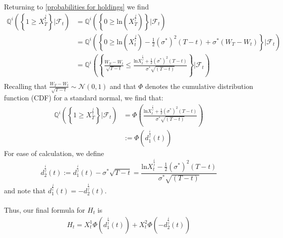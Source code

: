 \documentclass{article}
\theoremstyle{definition}
\begin{document}
Returning to \ref{probabilities for holdings} we find
\begin{align}
    \mathbb{Q}^{i}\left(\left\{1 \geq X_{T}^{\frac{j}{i}}\right\}|\mathcal{F}_{t}\right) &= \mathbb{Q}^{i}\left(\left\{0 \geq \text{ln} (X_{T}^{\frac{j}{i}})\right\}|\mathcal{F}_{t}\right)\\
    &=\mathbb{Q}^{i}\left(\left\{0\geq \text{ln}(X_t^{\frac{j}{i}}) -\frac{1}{2}(\sigma^*)^2(T-t) + \sigma^*(W_T-W_t)\right\}|\mathcal{F}_{t}\right)\\
    &=\mathbb{Q}^{i}\left(\left\{\frac{W_T-W_t}{\sqrt{T-t}} \leq \frac{\text{ln}X_t^{\frac{i}{j}}+\frac{1}{2}(\sigma^*)^2(T-t)}{\sigma^*\sqrt{(T-t)}}\right\}|\mathcal{F}_{t}\right)\\
\end{align}
Recalling that $\frac{W_T-W_t}{\sqrt{T-t}} \sim \mathcal{N}(0,1)$ and that $\Phi$ denotes the cumulative distribution function (CDF) for a standard normal, we find that:
\begin{align}
    \mathbb{Q}^{i}\left(\left\{1 \geq X_{T}^{\frac{j}{i}}\right\}|\mathcal{F}_{t}\right)&=\Phi\left(\frac{\text{ln}X_t^{\frac{i}{j}}+\frac{1}{2}(\sigma^*)^2(T-t)}{\sigma^*\sqrt{(T-t)}}\right)\\
    &:= \Phi\left(d_1^{\frac{i}{j}}(t)\right)
\end{align}
For ease of calculation, we define $$d_2^{\frac{i}{j}}(t) := d_1^{\frac{i}{j}}(t) - \sigma^*\sqrt{T-t} = \frac{\text{ln}X_t^{\frac{i}{j}}-\frac{1}{2}(\sigma^*)^2(T-t)}{\sigma^*\sqrt{(T-t)}}$$
and note that  $d_1^{\frac{j}{i}}(t) = -d_2^{\frac{i}{j}}(t)$.\\\\
Thus, our final formula for $H_t$ is 
\begin{align}
\label{final Ht formula}
    H_t = X_t^1 \Phi\left(d_1^{\frac{i}{j}}(t)\right) + X_t^2 \Phi
\left(-d_2^{\frac{i}{j}}(t)\right)
\end{align}
\end{document}

